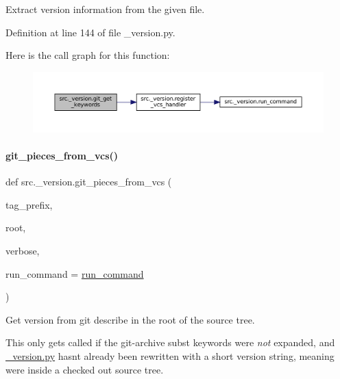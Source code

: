 Extract version information from the given file. 



Definition at line 144 of file \+\_\+version.\+py.

Here is the call graph for this function\+:
\nopagebreak
\begin{figure}[H]
\begin{center}
\leavevmode
\includegraphics[width=350pt]{namespacesrc_1_1__version_a55b4959421edb5200447f5199d19f4c1_cgraph}
\end{center}
\end{figure}
\mbox{\label{namespacesrc_1_1__version_a7f961ca0bf593256fdbc850f707dadca}} 
\paragraph{\texorpdfstring{git\+\_\+pieces\+\_\+from\+\_\+vcs()}{git\_pieces\_from\_vcs()}}
{\footnotesize\ttfamily def src.\+\_\+version.\+git\+\_\+pieces\+\_\+from\+\_\+vcs (\begin{DoxyParamCaption}\item[{}]{tag\+\_\+prefix,  }\item[{}]{root,  }\item[{}]{verbose,  }\item[{}]{run\+\_\+command = {\ttfamily \hyperlink{namespacesrc_1_1__version_a07869f13dacbb2c9659c38961e969824}{run\+\_\+command}} }\end{DoxyParamCaption})}



Get version from \textquotesingle{}git describe\textquotesingle{} in the root of the source tree. 

This only gets called if the git-\/archive \textquotesingle{}subst\textquotesingle{} keywords were {\itshape not} expanded, and \hyperlink{__version_8py}{\+\_\+version.\+py} hasn\textquotesingle{}t already been rewritten with a short version string, meaning we\textquotesingle{}re inside a checked out source tree. 

